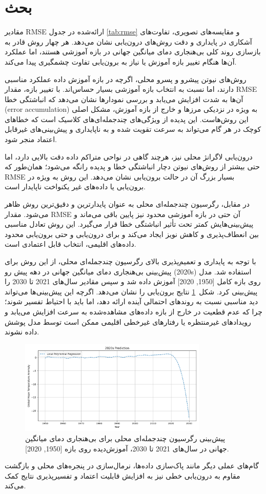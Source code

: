 \section{بحث}

مقادیر RMSE ارائه‌شده در جدول \ref{tab:rmse} و مقایسه‌های تصویری، تفاوت‌های آشکاری در پایداری و دقت روش‌های درون‌یابی نشان می‌دهد. هر چهار روش قادر به بازسازی روند کلی بی‌هنجاری دمای میانگین جهانی در بازه آموزشی هستند، اما عملکرد آن‌ها هنگام تغییر بازه آموزش یا نیاز به برون‌یابی تفاوت چشمگیری پیدا می‌کند.

روش‌های نیوتن پیشرو و پسرو محلی، اگرچه در بازه آموزش داده عملکرد مناسبی دارند، اما نسبت به انتخاب بازه آموزشی بسیار حساس‌اند. با تغییر بازه، مقدار RMSE آن‌ها به شدت افزایش می‌یابد و بررسی نمودارها نشان می‌دهد که انباشتگی خطا (error accumulation) به ویژه در نزدیکی مرزها و خارج از بازه آموزش، مشکل اصلی این روش‌هاست. این پدیده از ویژگی‌های چندجمله‌ای‌های کلاسیک است که خطاهای کوچک در هر گام می‌تواند به سرعت تقویت شده و به ناپایداری و پیش‌بینی‌های غیرقابل اعتماد منجر شود.

درون‌یابی لاگرانژ محلی نیز، هرچند گاهی در نواحی متراکم داده دقت بالایی دارد، اما حتی بیشتر از روش‌های نیوتن دچار انباشتگی خطا و پدیده رانگه می‌شود؛ همان‌طور که RMSE بسیار بزرگ آن در حالت برون‌یابی نشان می‌دهد. این روش به ویژه در برون‌یابی یا داده‌های غیر یکنواخت ناپایدار است.

در مقابل، رگرسیون چندجمله‌ای محلی به عنوان پایدارترین و دقیق‌ترین روش ظاهر می‌شود. مقدار RMSE آن حتی در بازه آموزشی محدود نیز پایین باقی می‌ماند و پیش‌بینی‌هایش کمتر تحت تأثیر انباشتگی خطا قرار می‌گیرد. این روش تعادل مناسبی بین انعطاف‌پذیری و کاهش نویز ایجاد می‌کند و برای درون‌یابی و حتی برون‌یابی محدود داده‌های اقلیمی، انتخاب قابل اعتمادی است.

با توجه به پایداری و تعمیم‌پذیری بالای رگرسیون چندجمله‌ای محلی، از این روش برای پیش‌بینی بی‌هنجاری دمای میانگین جهانی در دهه پیش رو (2020s) استفاده شد. مدل روی بازه کامل [1950, 2020] آموزش داده شد و سپس مقادیر سال‌های 2021 تا 2030 را پیش‌بینی کرد. شکل~\ref{fig:future-prediction} نتایج برون‌یابی را نشان می‌دهد. اگرچه این پیش‌بینی‌ها می‌تواند دید مناسبی نسبت به روندهای احتمالی آینده ارائه دهد، اما باید با احتیاط تفسیر شوند؛ چرا که عدم قطعیت در خارج از بازه داده‌های مشاهده‌شده به سرعت افزایش می‌یابد و رویدادهای غیرمنتظره یا رفتارهای غیرخطی اقلیمی ممکن است توسط مدل پوشش داده نشوند.

\begin{figure}[htbp]
    \centering
    \includegraphics[width=0.8\textwidth]{../figs/2020s-prediction.png}
    \caption{پیش‌بینی رگرسیون چندجمله‌ای محلی برای بی‌هنجاری دمای میانگین جهانی در سال‌های 2021 تا 2030، آموزش‌دیده روی بازه [1950, 2020].}
    \label{fig:future-prediction}
\end{figure}

گام‌های عملی دیگر مانند پاک‌سازی داده‌ها، نرمال‌سازی در پنجره‌های محلی و بازگشت مقاوم به درون‌یابی خطی نیز به افزایش قابلیت اعتماد و تفسیرپذیری نتایج کمک می‌کند.
